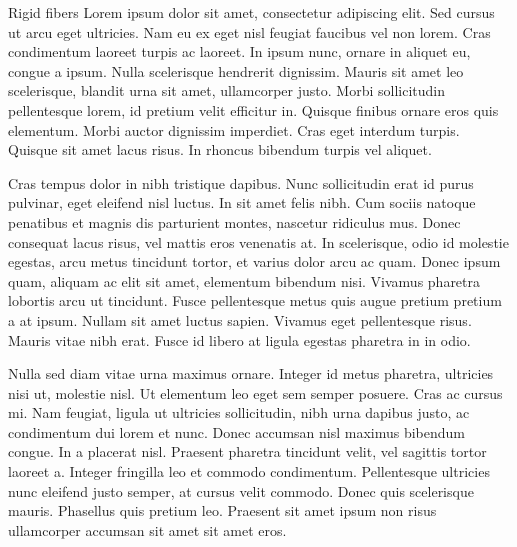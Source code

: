 \documentclass[a4paper,11pt]{kth-mag}
\begin{document}

Rigid fibers Lorem ipsum dolor sit amet, consectetur adipiscing elit. Sed cursus ut arcu eget ultricies. Nam eu ex eget nisl feugiat faucibus vel non lorem. Cras condimentum laoreet turpis ac laoreet. In ipsum nunc, ornare in aliquet eu, congue a ipsum. Nulla scelerisque hendrerit dignissim. Mauris sit amet leo scelerisque, blandit urna sit amet, ullamcorper justo. Morbi sollicitudin pellentesque lorem, id pretium velit efficitur in. Quisque finibus ornare eros quis elementum. Morbi auctor dignissim imperdiet. Cras eget interdum turpis. Quisque sit amet lacus risus. In rhoncus bibendum turpis vel aliquet.

Cras tempus dolor in nibh tristique dapibus. Nunc sollicitudin erat id purus pulvinar, eget eleifend nisl luctus. In sit amet felis nibh. Cum sociis natoque penatibus et magnis dis parturient montes, nascetur ridiculus mus. Donec consequat lacus risus, vel mattis eros venenatis at. In scelerisque, odio id molestie egestas, arcu metus tincidunt tortor, et varius dolor arcu ac quam. Donec ipsum quam, aliquam ac elit sit amet, elementum bibendum nisi. Vivamus pharetra lobortis arcu ut tincidunt. Fusce pellentesque metus quis augue pretium pretium a at ipsum. Nullam sit amet luctus sapien. Vivamus eget pellentesque risus. Mauris vitae nibh erat. Fusce id libero at ligula egestas pharetra in in odio.

Nulla sed diam vitae urna maximus ornare. Integer id metus pharetra, ultricies nisi ut, molestie nisl. Ut elementum leo eget sem semper posuere. Cras ac cursus mi. Nam feugiat, ligula ut ultricies sollicitudin, nibh urna dapibus justo, ac condimentum dui lorem et nunc. Donec accumsan nisl maximus bibendum congue. In a placerat nisl. Praesent pharetra tincidunt velit, vel sagittis tortor laoreet a. Integer fringilla leo et commodo condimentum. Pellentesque ultricies nunc eleifend justo semper, at cursus velit commodo. Donec quis scelerisque mauris. Phasellus quis pretium leo. Praesent sit amet ipsum non risus ullamcorper accumsan sit amet sit amet eros.
\end{document}
